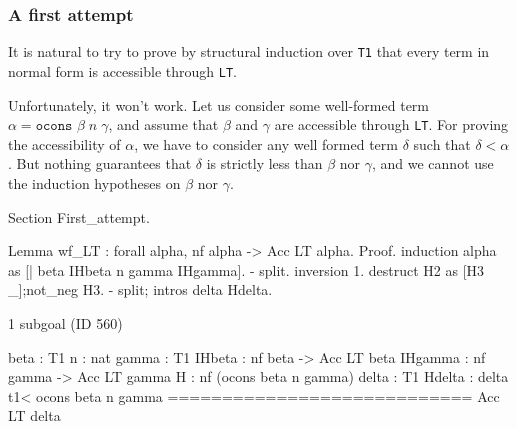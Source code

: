 \documentclass[a4paper]{book}
\begin{document}

  

 




\subsubsection{A first attempt}
\label{sec:orgheadline77}

It is natural to try to prove by structural induction over \texttt{T1} 
that every term in normal form is accessible through \texttt{LT}.

Unfortunately, it won't work. Let us consider some well-formed term
 $\alpha=\texttt{ocons $\beta\;n\;\gamma$}$, and assume that \(\beta\) and \(\gamma\) are accessible
 through \texttt{LT}. For proving the accessibility of $\alpha$, we have to consider
any well formed term \(\delta\) such that \(\delta<\alpha\). 
But nothing guarantees that \(\delta\)  is strictly  less than \(\beta\) nor \(\gamma\), and we cannot use the induction hypotheses on   \(\beta\) nor \(\gamma\).

\begin{Coqbad}
Section First_attempt.

 Lemma wf_LT : forall alpha,  nf alpha -> Acc LT alpha. 
 Proof.
  induction alpha as [| beta IHbeta n gamma IHgamma].
  - split.
    inversion 1.
    destruct H2 as [H3 _];not_neg H3.
  -  split; intros delta Hdelta.
\end{Coqbad}

\begin{Coqanswer}
1 subgoal (ID 560)
  
  beta : T1
  n : nat
  gamma : T1
  IHbeta : nf beta -> Acc LT beta
  IHgamma : nf gamma -> Acc LT gamma
  H : nf (ocons beta n gamma)
  delta : T1
  Hdelta : delta t1< ocons beta n gamma
  ============================
  Acc LT delta
 \end{Coqanswer}
\end{document}
